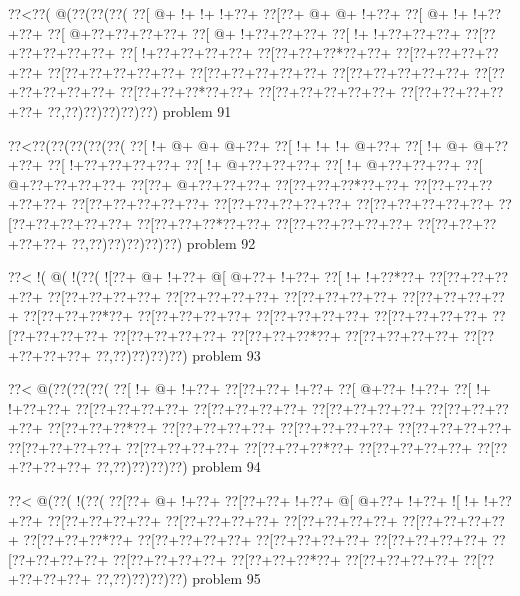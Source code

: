 \vbox{\vbox{\goo
\0??<\0??(\- @(\0??(\0??(\0??(
\0??[\- @+\- !+\- !+\- !+\0??+
\0??[\0??+\- @+\- @+\- !+\0??+
\0??[\- @+\- !+\- !+\0??+\0??+
\0??[\- @+\0??+\0??+\0??+\0??+
\0??[\- @+\- !+\0??+\0??+\0??+
\0??[\- !+\- !+\0??+\0??+\0??+
\0??[\0??+\0??+\0??+\0??+\0??+
\0??[\- !+\0??+\0??+\0??+\0??+
\0??[\0??+\0??+\0??*\0??+\0??+
\0??[\0??+\0??+\0??+\0??+\0??+
\0??[\0??+\0??+\0??+\0??+\0??+
\0??[\0??+\0??+\0??+\0??+\0??+
\0??[\0??+\0??+\0??+\0??+\0??+
\0??[\0??+\0??+\0??+\0??+\0??+
\0??[\0??+\0??+\0??*\0??+\0??+
\0??[\0??+\0??+\0??+\0??+\0??+
\0??[\0??+\0??+\0??+\0??+\0??+
\0??,\0??)\0??)\0??)\0??)\0??)
}
\hfil problem 91\hfil\break
}

\vbox{\vbox{\goo
\0??<\0??(\0??(\0??(\0??(\0??(
\0??[\- !+\- @+\- @+\- @+\0??+
\0??[\- !+\- !+\- !+\- @+\0??+
\0??[\- !+\- @+\- @+\0??+\0??+
\0??[\- !+\0??+\0??+\0??+\0??+
\0??[\- !+\- @+\0??+\0??+\0??+
\0??[\- !+\- @+\0??+\0??+\0??+
\0??[\- @+\0??+\0??+\0??+\0??+
\0??[\0??+\- @+\0??+\0??+\0??+
\0??[\0??+\0??+\0??*\0??+\0??+
\0??[\0??+\0??+\0??+\0??+\0??+
\0??[\0??+\0??+\0??+\0??+\0??+
\0??[\0??+\0??+\0??+\0??+\0??+
\0??[\0??+\0??+\0??+\0??+\0??+
\0??[\0??+\0??+\0??+\0??+\0??+
\0??[\0??+\0??+\0??*\0??+\0??+
\0??[\0??+\0??+\0??+\0??+\0??+
\0??[\0??+\0??+\0??+\0??+\0??+
\0??,\0??)\0??)\0??)\0??)\0??)
}
\hfil problem 92\hfil\break
}

\vbox{\vbox{\goo
\0??<\- !(\- @(\- !(\0??(
\- ![\0??+\- @+\- !+\0??+
\- @[\- @+\0??+\- !+\0??+
\0??[\- !+\- !+\0??*\0??+
\0??[\0??+\0??+\0??+\0??+
\0??[\0??+\0??+\0??+\0??+
\0??[\0??+\0??+\0??+\0??+
\0??[\0??+\0??+\0??+\0??+
\0??[\0??+\0??+\0??+\0??+
\0??[\0??+\0??+\0??*\0??+
\0??[\0??+\0??+\0??+\0??+
\0??[\0??+\0??+\0??+\0??+
\0??[\0??+\0??+\0??+\0??+
\0??[\0??+\0??+\0??+\0??+
\0??[\0??+\0??+\0??+\0??+
\0??[\0??+\0??+\0??*\0??+
\0??[\0??+\0??+\0??+\0??+
\0??[\0??+\0??+\0??+\0??+
\0??,\0??)\0??)\0??)\0??)
}
\hfil problem 93\hfil\break
}

\vbox{\vbox{\goo
\0??<\- @(\0??(\0??(\0??(
\0??[\- !+\- @+\- !+\0??+
\0??[\0??+\0??+\- !+\0??+
\0??[\- @+\0??+\- !+\0??+
\0??[\- !+\- !+\0??+\0??+
\0??[\0??+\0??+\0??+\0??+
\0??[\0??+\0??+\0??+\0??+
\0??[\0??+\0??+\0??+\0??+
\0??[\0??+\0??+\0??+\0??+
\0??[\0??+\0??+\0??*\0??+
\0??[\0??+\0??+\0??+\0??+
\0??[\0??+\0??+\0??+\0??+
\0??[\0??+\0??+\0??+\0??+
\0??[\0??+\0??+\0??+\0??+
\0??[\0??+\0??+\0??+\0??+
\0??[\0??+\0??+\0??*\0??+
\0??[\0??+\0??+\0??+\0??+
\0??[\0??+\0??+\0??+\0??+
\0??,\0??)\0??)\0??)\0??)
}
\hfil problem 94\hfil\break
}

\vbox{\vbox{\goo
\0??<\- @(\0??(\- !(\0??(
\0??[\0??+\- @+\- !+\0??+
\0??[\0??+\0??+\- !+\0??+
\- @[\- @+\0??+\- !+\0??+
\- ![\- !+\- !+\0??+\0??+
\0??[\0??+\0??+\0??+\0??+
\0??[\0??+\0??+\0??+\0??+
\0??[\0??+\0??+\0??+\0??+
\0??[\0??+\0??+\0??+\0??+
\0??[\0??+\0??+\0??*\0??+
\0??[\0??+\0??+\0??+\0??+
\0??[\0??+\0??+\0??+\0??+
\0??[\0??+\0??+\0??+\0??+
\0??[\0??+\0??+\0??+\0??+
\0??[\0??+\0??+\0??+\0??+
\0??[\0??+\0??+\0??*\0??+
\0??[\0??+\0??+\0??+\0??+
\0??[\0??+\0??+\0??+\0??+
\0??,\0??)\0??)\0??)\0??)
}
\hfil problem 95\hfil\break
}

